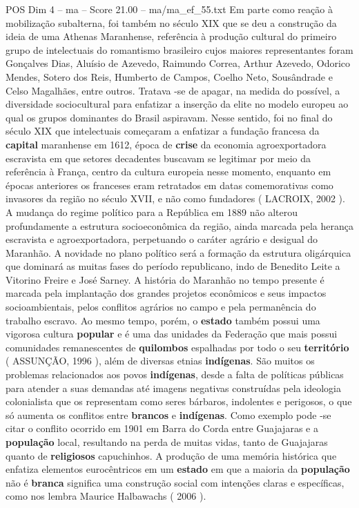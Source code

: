 \begin{textsample}{POS Dim 4 – ma – Score 21.00 – ma/ma\_ef\_55.txt}
Em parte como reação à mobilização subalterna, foi também no século XIX que se deu a construção da ideia de uma Athenas Maranhense, referência à produção cultural do primeiro grupo de intelectuais do romantismo brasileiro cujos maiores representantes foram Gonçalves Dias, Aluísio de Azevedo, Raimundo Correa, Arthur Azevedo, Odorico Mendes, Sotero dos Reis, Humberto de Campos, Coelho Neto, Sousândrade e Celso Magalhães, entre outros.
Tratava -se de apagar, na medida do possível, a diversidade sociocultural para enfatizar a inserção da elite no modelo europeu ao qual os grupos dominantes do Brasil aspiravam.
Nesse sentido, foi no final do século XIX que intelectuais começaram a enfatizar a fundação francesa da \textbf{capital} maranhense em 1612, época de \textbf{crise} da economia agroexportadora escravista em que setores decadentes buscavam se legitimar por meio da referência à França, centro da cultura europeia nesse momento, enquanto em épocas anteriores os franceses eram retratados em datas comemorativas como invasores da região no século XVII, e não como fundadores ( LACROIX, 2002 ).
A mudança do regime político para a República em 1889 não alterou profundamente a estrutura socioeconômica da região, ainda marcada pela herança escravista e agroexportadora, perpetuando o caráter agrário e desigual do Maranhão.
A novidade no plano político será a formação da estrutura oligárquica que dominará as muitas fases do período republicano, indo de Benedito Leite a Vitorino Freire e José Sarney.
A história do Maranhão no tempo presente é marcada pela implantação dos grandes projetos econômicos e seus impactos socioambientais, pelos conflitos agrários no campo e pela permanência do trabalho escravo.
Ao mesmo tempo, porém, o \textbf{estado} também possui uma vigorosa cultura \textbf{popular} e é uma das unidades da Federação que mais possui comunidades remanescentes de \textbf{quilombos} espalhadas por todo o seu \textbf{território} ( ASSUNÇÃO, 1996 ), além de diversas etnias \textbf{indígenas}.
São muitos os problemas relacionados aos povos \textbf{indígenas}, desde a falta de políticas públicas para atender a suas demandas até imagens negativas construídas pela ideologia colonialista que os representam como seres bárbaros, indolentes e perigosos, o que só aumenta os conflitos entre \textbf{brancos} e \textbf{indígenas}.
Como exemplo pode -se citar o conflito ocorrido em 1901 em Barra do Corda entre Guajajaras e a \textbf{população} local, resultando na perda de muitas vidas, tanto de Guajajaras quanto de \textbf{religiosos} capuchinhos.
A produção de uma memória histórica que enfatiza elementos eurocêntricos em um \textbf{estado} em que a maioria da \textbf{população} não é \textbf{branca} significa uma construção social com intenções claras e específicas, como nos lembra Maurice Halbawachs ( 2006 ).

\end{textsample}
